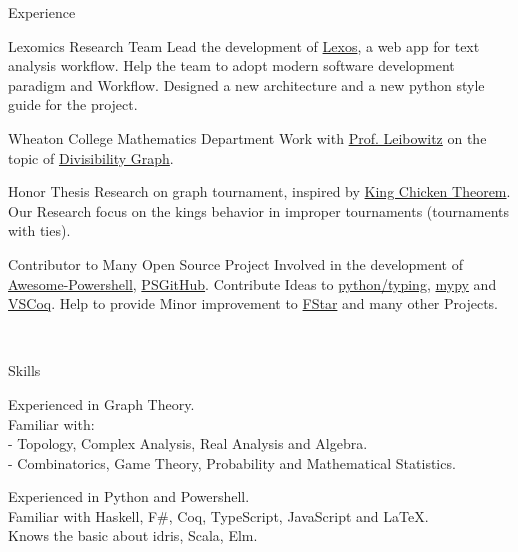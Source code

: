 \documentclass[]{resume-knyte}
\begin{document}
\begin{topic}{Experience}


    {Lexomics Research Team}
    {Lead the development of \href{https://github.com/WheatonCS/Lexos}{Lexos}, a web app for text analysis workflow.
    Help the team to adopt modern software development paradigm and Workflow.
    Designed a new architecture and a new python style guide for the project.}

    {Wheaton College Mathematics Department}
    {Work with \href{https://wheatoncollege.edu/academics/faculty-directory/rochelle-shelly-leibowitz/}{Prof. Leibowitz}
    on the topic of \href{https://chantisnake.github.io/2016/05/22/explain-the-divisibility-graph/}{Divisibility Graph}.}

    {Honor Thesis}
    {Research on graph tournament, inspired by \href{https://www.maa.org/sites/default/files/pdf/upload_library/22/Allendoerfer/1981/0025570x.di021114.02p00982.pdf}{King Chicken Theorem}.
    Our Research focus on the kings behavior in improper tournaments (tournaments with ties).}


    {Contributor to Many Open Source Project}
    {Involved in the development of \href{https://github.com/janikvonrotz/awesome-powershell}{Awesome-Powershell}, \href{https://github.com/pcgeek86/PSGitHub}{PSGitHub}.
    Contribute Ideas to \href{https://github.com/python/typing}{python/typing}, \href{https://github.com/python/mypy}{mypy} and \href{https://github.com/siegebell/vscoq}{VSCoq}.
    Help to provide Minor improvement to \href{https://github.com/FStarLang/FStar}{FStar} and many other Projects.}

\\ %
\end{topic}



\begin{topic}{Skills}


    {Experienced in Graph Theory.\\
    Familiar with:\\
    - Topology, Complex Analysis, Real Analysis and Algebra.\\
    - Combinatorics, Game Theory, Probability and Mathematical Statistics.}

    {Experienced in Python and Powershell.\\
    Familiar with Haskell, F\#, Coq, TypeScript, JavaScript and \LaTeX{}.\\
    Knows the basic about idris, Scala, Elm.}


    \\ %
\end{topic}
\end{document}
